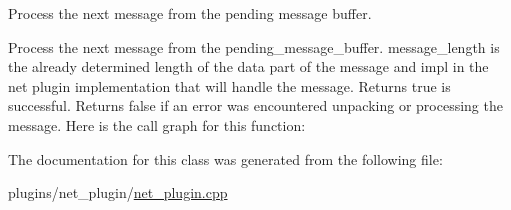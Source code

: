Process the next message from the pending message buffer. 

Process the next message from the pending\+\_\+message\+\_\+buffer. message\+\_\+length is the already determined length of the data part of the message and impl in the net plugin implementation that will handle the message. Returns true is successful. Returns false if an error was encountered unpacking or processing the message. Here is the call graph for this function\+:


The documentation for this class was generated from the following file\+:\begin{DoxyCompactItemize}
\item 
plugins/net\+\_\+plugin/\mbox{\hyperlink{net__plugin_8cpp}{net\+\_\+plugin.\+cpp}}\end{DoxyCompactItemize}
